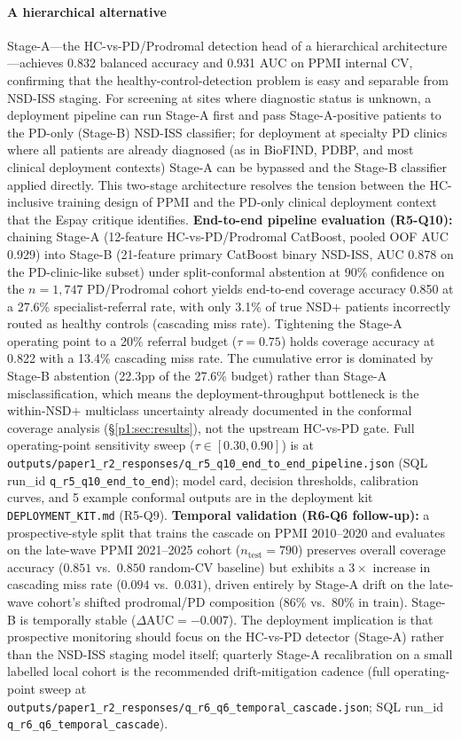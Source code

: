 \paragraph*{A hierarchical alternative} Stage-A---the HC-vs-PD/Prodromal detection head of a hierarchical architecture---achieves 0.832 balanced accuracy and 0.931 AUC on PPMI internal CV, confirming that the healthy-control-detection problem is easy and separable from NSD-ISS staging. For screening at sites where diagnostic status is unknown, a deployment pipeline can run Stage-A first and pass Stage-A-positive patients to the PD-only (Stage-B) NSD-ISS classifier; for deployment at specialty PD clinics where all patients are already diagnosed (as in BioFIND, PDBP, and most clinical deployment contexts) Stage-A can be bypassed and the Stage-B classifier applied directly. This two-stage architecture resolves the tension between the HC-inclusive training design of PPMI and the PD-only clinical deployment context that the Espay critique identifies. \textbf{End-to-end pipeline evaluation (R5-Q10):} chaining Stage-A (12-feature HC-vs-PD/Prodromal CatBoost, pooled OOF AUC 0.929) into Stage-B (21-feature primary CatBoost binary NSD-ISS, AUC 0.878 on the PD-clinic-like subset) under split-conformal abstention at 90\% confidence on the $n{=}1{,}747$ PD/Prodromal cohort yields end-to-end coverage accuracy 0.850 at a 27.6\% specialist-referral rate, with only 3.1\% of true NSD$+$ patients incorrectly routed as healthy controls (cascading miss rate). Tightening the Stage-A operating point to a 20\% referral budget ($\tau{=}0.75$) holds coverage accuracy at 0.822 with a 13.4\% cascading miss rate. The cumulative error is dominated by Stage-B abstention (22.3pp of the 27.6\% budget) rather than Stage-A misclassification, which means the deployment-throughput bottleneck is the within-NSD$+$ multiclass uncertainty already documented in the conformal coverage analysis (\S\ref{p1:sec:results}), not the upstream HC-vs-PD gate. Full operating-point sensitivity sweep ($\tau \in [0.30, 0.90]$) is at \texttt{outputs/paper1\_r2\_responses/q\_r5\_q10\_end\_to\_end\_pipeline.json} (SQL run\_id \texttt{q\_r5\_q10\_end\_to\_end}); model card, decision thresholds, calibration curves, and 5 example conformal outputs are in the deployment kit \texttt{DEPLOYMENT\_KIT.md} (R5-Q9). \textbf{Temporal validation (R6-Q6 follow-up):} a prospective-style split that trains the cascade on PPMI 2010--2020 and evaluates on the late-wave PPMI 2021--2025 cohort ($n_{\mathrm{test}}{=}790$) preserves overall coverage accuracy ($0.851$ vs.\ $0.850$ random-CV baseline) but exhibits a $3{\times}$ increase in cascading miss rate ($0.094$ vs.\ $0.031$), driven entirely by Stage-A drift on the late-wave cohort's shifted prodromal/PD composition (86\% vs.\ 80\% in train). Stage-B is temporally stable ($\Delta\mathrm{AUC} = -0.007$). The deployment implication is that prospective monitoring should focus on the HC-vs-PD detector (Stage-A) rather than the NSD-ISS staging model itself; quarterly Stage-A recalibration on a small labelled local cohort is the recommended drift-mitigation cadence (full operating-point sweep at \texttt{outputs/paper1\_r2\_responses/q\_r6\_q6\_temporal\_cascade.json}; SQL run\_id \texttt{q\_r6\_q6\_temporal\_cascade}).

